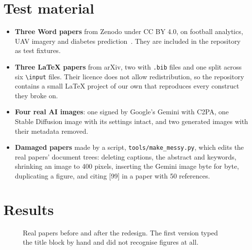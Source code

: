 \documentclass[11pt,a4paper,oneside,openany]{book}
\newcommand{\code}[1]{\texttt{#1}}
\begin{document}
\section{Test material}
\begin{itemize}
\item \textbf{Three Word papers} from Zenodo under CC BY 4.0, on football analytics, UAV imagery and
diabetes prediction~\cite{zyolo,zuav,zsvm}. They are included in the repository as test fixtures.
\item \textbf{Three \LaTeX{} papers} from arXiv, two with \code{.bib} files and one split across six
\code{\textbackslash input} files. Their licence does not allow redistribution, so the repository contains a small
\LaTeX{} project of our own that reproduces every construct they broke on.
\item \textbf{Four real AI images}: one signed by Google's Gemini with C2PA, one Stable Diffusion image with its
settings intact, and two generated images with their metadata removed.
\item \textbf{Damaged papers} made by a script, \code{tools/make\_messy.py}, which edits the real papers'
document trees: deleting captions, the abstract and keywords, shrinking an image to 400 pixels, inserting
the Gemini image byte for byte, duplicating a figure, and citing [99] in a paper with 50 references.
\end{itemize}

\section{Results}

\begin{figure}[htbp]
\centering
{}
\caption{Real papers before and after the redesign. The first version typed the title block by hand and
did not recognise figures at all.}
\end{figure}
\end{document}

